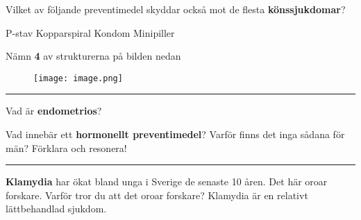 \documentclass{exam}
\begin{document}
\begin{questions}
\question Vilket av följande preventimedel skyddar också mot de flesta \textbf{könssjukdomar}?
\begin{checkboxes}
   \choice P-stav
   \choice Kopparspiral
   \choice Kondom
   \choice Minipiller
\end{checkboxes}

\break


\vspace{5mm} %
\begin{center}
\end{center}
\vspace{5mm} %
\question Nämn \textbf{4} av strukturerna på bilden nedan
\begin{figure}[h]
    \centering
    \texttt{[image: image.png]}
\end{figure}
\vspace{40mm} 
\hrule 
\vspace{5mm}
\question 
Vad är \textbf{endometrios}?



\break
\vspace{5mm} %
\begin{center}
\end{center}
\vspace{5mm} %
\question 
Vad innebär ett \textbf{hormonellt preventimedel}? Varför finns det inga sådana för män? Förklara och resonera!

\vspace{90mm} 
\hrule 
\vspace{5mm}
\question 
\textbf{Klamydia} har ökat bland unga i Sverige de senaste 10 åren. Det här oroar forskare. Varför tror du att det oroar forskare? Klamydia är en relativt lättbehandlad sjukdom.

\end{questions}
\end{document}
